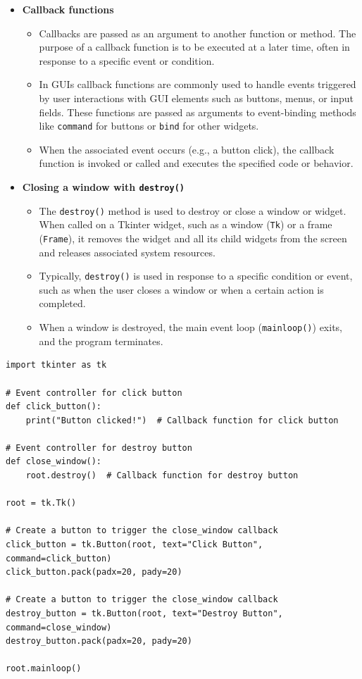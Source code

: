 \begin{itemize}
    \item \textbf{Callback functions}
    \begin{itemize}
        \item Callbacks are passed as an argument to another function or method. The purpose of a callback function is to be executed at a later time, often in response to a specific event or condition.
        \item In GUIs callback functions are commonly used to handle events triggered by user interactions with GUI elements such as buttons, menus, or input fields. These functions are passed as arguments to event-binding methods like \texttt{command} for buttons or \texttt{bind} for other widgets.
        \item When the associated event occurs (e.g., a button click), the callback function is invoked or called and executes the specified code or behavior.
    \end{itemize}
    
    \item \textbf{Closing a window with \texttt{destroy()}}
    \begin{itemize}
        \item The \texttt{destroy()} method is used to destroy or close a window or widget. When called on a Tkinter widget, such as a window (\texttt{Tk}) or a frame (\texttt{Frame}), it removes the widget and all its child widgets from the screen and releases associated system resources.
        \item Typically, \texttt{destroy()} is used in response to a specific condition or event, such as when the user closes a window or when a certain action is completed.
        \item When a window is destroyed, the main event loop (\texttt{mainloop()}) exits, and the program terminates.
    \end{itemize}
    
\end{itemize}

\begin{codebox}
\begin{verbatim}
import tkinter as tk

# Event controller for click button
def click_button():
    print("Button clicked!")  # Callback function for click button

# Event controller for destroy button
def close_window():
    root.destroy()  # Callback function for destroy button

root = tk.Tk()

# Create a button to trigger the close_window callback
click_button = tk.Button(root, text="Click Button", command=click_button)
click_button.pack(padx=20, pady=20)

# Create a button to trigger the close_window callback
destroy_button = tk.Button(root, text="Destroy Button", command=close_window)
destroy_button.pack(padx=20, pady=20)

root.mainloop()
\end{verbatim}
\end{codebox}

